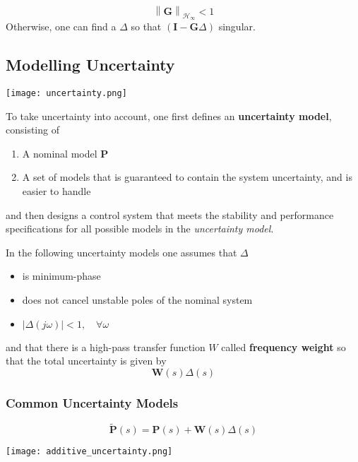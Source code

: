 \begin{equation*}
    {\left\|\mathbf{G}\right\|}_{\mathcal{H}_{\infty}}<1
\end{equation*}
Otherwise, one can find a $\Delta$ so that $(\mathbf{I}-\mathbf{G}\Delta)$ singular.

\subsection{Modelling Uncertainty}
\begin{center}
    \texttt{[image: uncertainty.png]}
\end{center}
To take uncertainty into account, one first defines an \textbf{uncertainty model}, consisting of
\begin{enumerate}
    \item A nominal model $\mathbf{P}$
    \item A set of models that is guaranteed to contain the system uncertainty, and is easier to handle
\end{enumerate}
and then designs a control system that meets the stability and performance specifications for all possible models in the \textit{uncertainty model}.

\newpar{}

In the following uncertainty models one assumes that $\Delta$
\begin{itemize}
    \item is minimum-phase
    \item does not cancel unstable poles of the nominal system
    \item $|\Delta(j\omega)|<1,\quad\forall\omega$
\end{itemize}
and that there is a high-pass transfer function $W$ called \textbf{frequency weight} so that the total uncertainty is given by
\begin{equation*}
    \mathbf{W}(s)\Delta(s)
\end{equation*}

\subsubsection{Common Uncertainty Models}
\begin{equation*}
    \tilde{\mathbf{P}}(s)=\mathbf{P}(s)+\mathbf{W}(s)\Delta(s)
\end{equation*}
\begin{center}
    \texttt{[image: additive\_uncertainty.png]}
\end{center}


